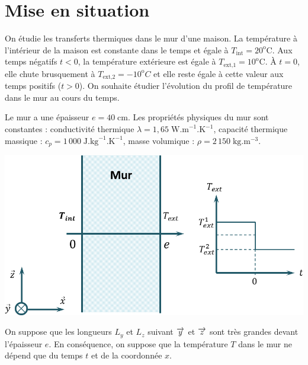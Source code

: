 \documentclass[10pt,fleqn]{article} %
\begin{document}

\vspace{1cm}
\pagestyle{fancy}
\thispagestyle{plain}


\section{Mise en situation}
\ifprof
\else
\vspace{.25cm}

\noindent \begin{minipage}[c]{.6\linewidth}
On étudie les transferts thermiques dans le mur d’une maison. La température à
l'intérieur de la maison est constante dans le temps et égale à $T_{\text{int}}=20^{\text{o}} \text{C}$. Aux temps négatifs $t<0$, la température extérieure est égale à $T_{\text{ext,1}}=10^{\text{o}} \text{C}$. À $t=0$, elle chute brusquement à $T_{\text{ext,2}}=-10^{\text{o}} C$ et elle reste égale à cette valeur aux temps positifs ($t>0$). On
souhaite étudier l'évolution du profil de température dans le mur au cours du temps.

Le mur a une épaisseur $e=40\;\text{cm}$. Les propriétés physiques du mur sont constantes : conductivité thermique $\lambda = 1,65\; \text{W.m}^{-1}.\text{K}^{-1}$, capacité thermique massique : $c_p = 1\, 000\; \text{J}.\text{kg}^{-1}.\text{K}^{-1}$, masse volumique : $\rho = 2\, 150 \; \text{kg}.\text{m}^{-3}$. 

\end{minipage} \hfill
\begin{minipage}[c]{.38\linewidth}
\begin{center}
\includegraphics[width=\linewidth]{images/figure_01}
\end{center}
\end{minipage}

\noindent
On suppose que les longueurs $L_y$ et $L_z$ suivant $\overrightarrow{y}$ et $\overrightarrow{z}$ sont très grandes devant l'épaisseur $e$. En conséquence, on suppose que la température $T$ dans le mur ne dépend que du temps $t$ et de la coordonnée $x$. 
\end{document}
